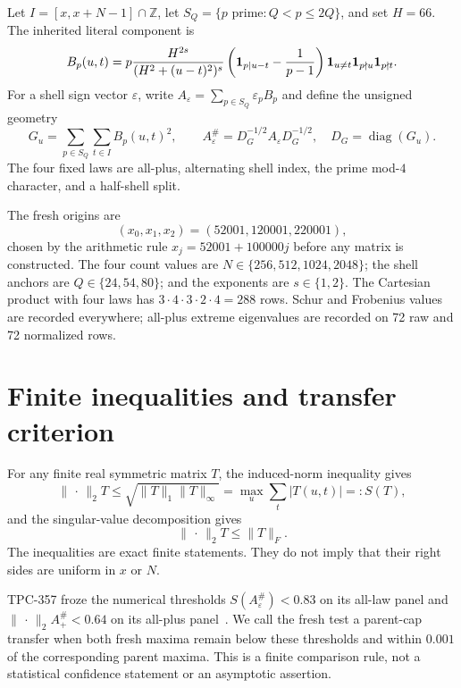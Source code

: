 \documentclass[10pt]{article}
\newcommand{\opnorm}{\lVert\,\cdot\,\rVert_2}
\begin{document}
Let $I=[x,x+N-1]\cap\mathbb Z$, let
$S_Q=\{p\text{ prime}:Q<p\leq2Q\}$, and set $H=66$.  The inherited literal
component is
\begin{equation}
 B_p(u,t)=p\frac{H^{2s}}{(H^2+(u-t)^2)^s}
 \left({\bf1}_{p\mid u-t}-\frac1{p-1}\right)
 {\bf1}_{u\ne t}{\bf1}_{p\nmid u}{\bf1}_{p\nmid t}.
 \label{eq:block}
\end{equation}
For a shell sign vector $\varepsilon$, write
$A_\varepsilon=\sum_{p\in S_Q}\varepsilon_pB_p$ and define the unsigned
geometry
\begin{equation}
 G_u=\sum_{p\in S_Q}\sum_{t\in I}B_p(u,t)^2,
 \qquad A_\varepsilon^\#=D_G^{-1/2}A_\varepsilon D_G^{-1/2},
 \quad D_G=\operatorname{diag}(G_u).
 \label{eq:norm}
\end{equation}
The four fixed laws are all-plus, alternating shell index, the prime mod-$4$
character, and a half-shell split.

The fresh origins are
\[
 (x_0,x_1,x_2)=(52001,120001,220001),
\]
chosen by the arithmetic rule $x_j=52001+100000j$ before any matrix is
constructed.  The four count values are
$N\in\{256,512,1024,2048\}$; the shell anchors are
$Q\in\{24,54,80\}$; and the exponents are $s\in\{1,2\}$.  The Cartesian
product with four laws has $3\cdot4\cdot3\cdot2\cdot4=288$ rows.  Schur and
Frobenius values
are recorded everywhere; all-plus extreme eigenvalues are recorded on 72 raw
and 72 normalized rows.

\section{Finite inequalities and transfer criterion}

For any finite real symmetric matrix $T$, the induced-norm inequality gives
\begin{equation}
 \opnorm{T}\leq\sqrt{\lVert T\rVert_1\lVert T\rVert_\infty}
 =\max_u\sum_t|T(u,t)|=:S(T),
 \label{eq:schur}
\end{equation}
and the singular-value decomposition gives
\begin{equation}
 \opnorm{T}\leq\lVert T\rVert_F.
 \label{eq:frob}
\end{equation}
The inequalities are exact finite statements.  They do not imply that their
right sides are uniform in $x$ or $N$.

TPC-357 froze the numerical thresholds
$S(A_\varepsilon^\#)<0.83$ on its all-law panel and
$\opnorm{A_{+}^\#}<0.64$ on its all-plus panel~\cite{tpc357}.  We call the
fresh test a parent-cap transfer when both fresh maxima remain below these
thresholds and within $0.001$ of the corresponding parent maxima.  This is a
finite comparison rule, not a statistical confidence statement or an
asymptotic assertion.
\end{document}
